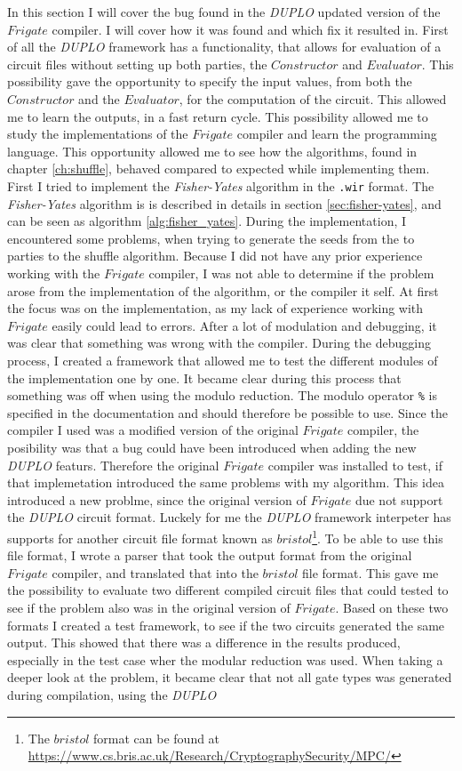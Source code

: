 \documentclass[twoside,11pt,openright]{report}
\newcommand{\FY}{\textit{Fisher-Yates} }
\newcommand{\DUPLO}{\textit{DUPLO} }
\begin{document}
In this section I will cover the bug found in the \DUPLO updated version of the $Frigate$ compiler. I will cover how it was found and which fix it resulted in. First of all the \DUPLO framework has a functionality, that allows for evaluation of a circuit files without setting up both parties, the $Constructor$ and $Evaluator$. This possibility gave the opportunity to specify the input values, from both the $Constructor$ and the $Evaluator$, for the computation of the circuit. This allowed me to learn the outputs, in a fast return cycle. This possibility allowed me to study the implementations of the $Frigate$ compiler and learn the programming language. This opportunity allowed me to see how the algorithms, found in chapter \ref{ch:shuffle}, behaved compared to expected while implementing them. First I tried to implement the \FY algorithm in the \verb|.wir| format. The \FY algorithm is is described in details in section \ref{sec:fisher-yates}, and can be seen as algorithm \ref{alg:fisher_yates}. During the implementation, I encountered some problems, when trying to generate the seeds from the to parties to the shuffle algorithm. Because I did not have any prior experience working with the $Frigate$ compiler, I was not able to determine if the problem arose from the implementation of the algorithm, or the compiler it self. At first the focus was on the implementation, as my lack of experience working with $Frigate$ easily could lead to errors. After a lot of modulation and debugging, it was clear that something was wrong with the compiler. During the debugging process, I created a framework that allowed me to test the different modules of the implementation one by one. It became clear during this process that something was off when using the modulo reduction. The modulo operator \verb|%| is specified in the documentation and should therefore be possible to use. Since the compiler I used was a modified version of the original $Frigate$ compiler, the posibility was that a bug could have been introduced when adding the new \DUPLO featurs. Therefore the original $Frigate$ compiler was installed to test, if that implemetation introduced the same problems with my algorithm. This idea introduced a new problme, since the original version of $Frigate$ due not support the \DUPLO circuit format. Luckely for me the \DUPLO framework interpeter has supports for another circuit file format known as $bristol$\footnote{The $bristol$ format can be found at \newline\url{https://www.cs.bris.ac.uk/Research/CryptographySecurity/MPC/}}. To be able to use this file format, I wrote a parser that took the output format from the original $Frigate$ compiler, and translated that into the $bristol$ file format. This gave me the possibility to evaluate two different compiled circuit files that could tested to see if the problem also was in the original version of $Frigate$. Based on these two formats I created a test framework, to see if the two circuits generated the same output. This showed that there was a difference in the results produced, especially in the test case wher the modular reduction was used. When taking a deeper look at the problem, it became clear that not all gate types was generated during compilation, using the \DUPLO 
\end{document}
